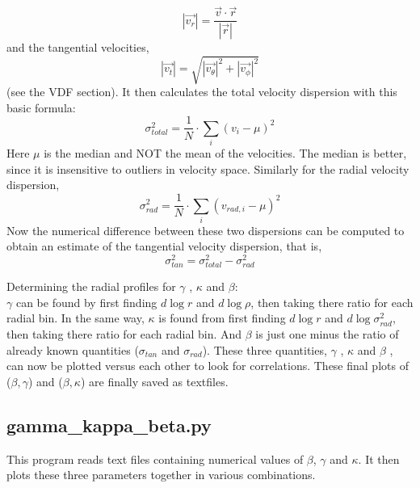 \begin{equation}
|\vec{v_r}| = \frac{\vec{v} \cdot \vec{r}}{|\vec{r}|}     
\end{equation}
and the tangential velocities,
\begin{equation}
|\vec{v_t}| = \sqrt{|\vec{v_\theta}|^2 + |\vec{v_\phi}|^2}     
\end{equation}
(see the VDF section). It then calculates the total velocity dispersion with this basic formula:
\begin{equation}
\sigma_{total}^2 = \frac{1}{N}\cdot \sum\limits_{i} (v_i - \mu)^2
\end{equation}
Here $\mu$ is the median and NOT the mean of the velocities.
The median is better, since it is insensitive to outliers in velocity space.
Similarly for the radial velocity dispersion,
\begin{equation}
\sigma_{rad}^2 = \frac{1}{N}\cdot \sum\limits_{i} (v_{rad,i} - \mu)^2
\end{equation}
Now the numerical difference between these two dispersions can be computed to obtain an estimate of the tangential velocity dispersion, that is,
\begin{equation}
\sigma_{tan}^2 = \sigma_{total}^2 - \sigma_{rad}^2
\end{equation}

Determining the radial profiles for $ \gamma $ , $\kappa$ and $ \beta $: \\
$ \gamma $ can be found by first finding $d\log r$ and $d \log \rho$, then taking there ratio for each radial bin. In the same way, $ \kappa $ is found from first finding $d\log r$ and $d \log \sigma_{rad}^2$, then taking there ratio for each radial bin. And $ \beta $ is just one minus the ratio of already known quantities ($\sigma_{tan}$ and $\sigma_{rad}$). These three quantities, $ \gamma $ , $\kappa$ and $ \beta $ , can now be plotted versus each other to look for correlations. These final plots of ($\beta,\gamma$) and ($\beta,\kappa$) are finally saved as textfiles. \\ 
%

\subsection{gamma\_kappa\_beta.py}
This program reads text files containing numerical values of $\beta$, $\gamma$ and $\kappa$. It then plots these three parameters together in various combinations.
 
